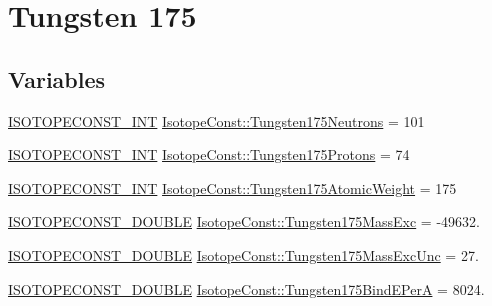 \hypertarget{group___isotope_const-_tungsten-_w175}{}\section{Tungsten 175}
\label{group___isotope_const-_tungsten-_w175}
\subsection*{Variables}
\begin{DoxyCompactItemize}
\item 
\mbox{\hyperlink{group___isotope_const-_macros_ga5f18360b3e99483a35c32d789e62621c}{I\+S\+O\+T\+O\+P\+E\+C\+O\+N\+S\+T\+\_\+\+I\+NT}} \mbox{\hyperlink{group___isotope_const-_tungsten-_w175_ga598ca4844fe4c45eff7337527c7f4685}{Isotope\+Const\+::\+Tungsten175\+Neutrons}} = 101
\item 
\mbox{\hyperlink{group___isotope_const-_macros_ga5f18360b3e99483a35c32d789e62621c}{I\+S\+O\+T\+O\+P\+E\+C\+O\+N\+S\+T\+\_\+\+I\+NT}} \mbox{\hyperlink{group___isotope_const-_tungsten-_w175_ga99829e6beaac61a3c1d786e7ef6c5155}{Isotope\+Const\+::\+Tungsten175\+Protons}} = 74
\item 
\mbox{\hyperlink{group___isotope_const-_macros_ga5f18360b3e99483a35c32d789e62621c}{I\+S\+O\+T\+O\+P\+E\+C\+O\+N\+S\+T\+\_\+\+I\+NT}} \mbox{\hyperlink{group___isotope_const-_tungsten-_w175_ga31873c7bf860db3ea10504cebd63126c}{Isotope\+Const\+::\+Tungsten175\+Atomic\+Weight}} = 175
\item 
\mbox{\hyperlink{group___isotope_const-_macros_ga8f45a7272ce02c0b4c65c44636ed719a}{I\+S\+O\+T\+O\+P\+E\+C\+O\+N\+S\+T\+\_\+\+D\+O\+U\+B\+LE}} \mbox{\hyperlink{group___isotope_const-_tungsten-_w175_ga9be4ae782bb60466035f94c50a760cce}{Isotope\+Const\+::\+Tungsten175\+Mass\+Exc}} = -\/49632.
\item 
\mbox{\hyperlink{group___isotope_const-_macros_ga8f45a7272ce02c0b4c65c44636ed719a}{I\+S\+O\+T\+O\+P\+E\+C\+O\+N\+S\+T\+\_\+\+D\+O\+U\+B\+LE}} \mbox{\hyperlink{group___isotope_const-_tungsten-_w175_ga0881d1a11ddd90191797b9cdc19119ee}{Isotope\+Const\+::\+Tungsten175\+Mass\+Exc\+Unc}} = 27.
\item 
\mbox{\hyperlink{group___isotope_const-_macros_ga8f45a7272ce02c0b4c65c44636ed719a}{I\+S\+O\+T\+O\+P\+E\+C\+O\+N\+S\+T\+\_\+\+D\+O\+U\+B\+LE}} \mbox{\hyperlink{group___isotope_const-_tungsten-_w175_ga4e59eee0ee625f21acb18b89beeaa333}{Isotope\+Const\+::\+Tungsten175\+Bind\+E\+PerA}} = 8024.
\item 

\end{DoxyCompactItemize}
